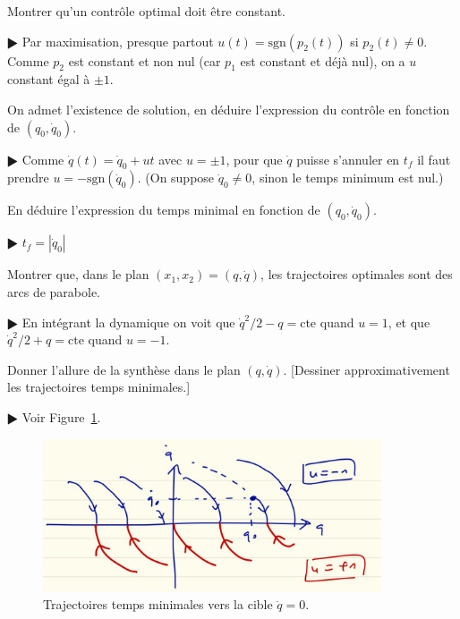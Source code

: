 \documentclass[11pt,a4paper]{article}
\newcommand{\sgn}{\mathrm{sgn}}
\theoremstyle{plain}
\theoremstyle{definition}
\begin{document}
\begin{Exercice}[10 points]
\begin{Question} Montrer qu'un contr\^ole optimal doit \^etre constant. \end{Question}
\begin{corr} $\RHD$ Par maximisation, presque partout $u(t)=\sgn(p_2(t))$ si $p_2(t) \neq 0$.
Comme $p_2$ est constant
et non nul (car $p_1$ est constant et d\'ej\`a nul), on a $u$ constant \'egal \`a
$\pm 1$. \end{corr}

\begin{Question} On admet l'existence de solution, en d\'eduire l'expression du
contr\^ole en fonction de $(q_0,\dot{q}_0)$. 
\end{Question}
\begin{corr} $\RHD$ Comme $\dot{q}(t)=\dot{q}_0+ut$ avec $u=\pm 1$, pour que $\dot{q}$
puisse s'annuler en $t_f$ il faut prendre $u=-\sgn(\dot{q}_0)$. (On suppose $\dot{q}_0
\neq 0$, sinon le temps minimum est nul.)
\end{corr}

\begin{Question} En d\'eduire l'expression du temps minimal en fonction de
$(q_0,\dot{q}_0)$.
\end{Question}
\begin{corr} $\RHD$ $t_f=|\dot{q}_0|$
\end{corr}

\begin{Question} Montrer que, dans le plan $(x_1,x_2)=(q,\dot{q})$, les trajectoires
optimales sont des arcs de parabole.
\end{Question}
\begin{corr} $\RHD$ En int\'egrant la dynamique on voit que $\dot{q}^2/2-q=\text{cte}$
quand $u=1$, et que $\dot{q}^2/2+q=\text{cte}$ quand $u=-1$.
\end{corr}

\begin{Question} Donner l'allure de la synth\`ese dans le plan $(q,\dot{q})$. [Dessiner
approximativement les trajectoires temps minimales.]
\end{Question}
\begin{corr} $\RHD$ Voir Figure~\ref{fig1}.
\begin{figure}[t]
\includegraphics[width=10cm]{fig1} \centering
\caption{Trajectoires temps minimales vers la cible $\dot{q}=0$.}
\label{fig1}
\end{figure}
\end{corr}
\end{Exercice}
\end{document}
